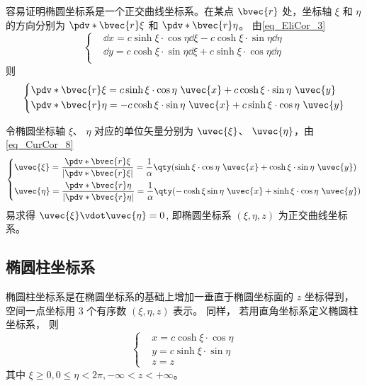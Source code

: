 容易证明椭圆坐标系是一个正交曲线坐标系。在某点 $\bvec{r}$ 处，坐标轴 $\xi$ 和 $\eta$ 的方向分别为 $\pdv*{\bvec{r}}{\xi}$ 和 $\pdv*{\bvec{r}}{\eta}$。
由\autoref{eq_EliCor_3} 
\begin{equation}
\left\{
    \begin{aligned}
    &\dd x=c\sinh\xi\cdot\cos\eta\dd\xi-c\cosh\xi\cdot\sin\eta\dd\eta\\
    &\dd y=c\cosh\xi\cdot\sin\eta\dd\xi+c\sinh\xi\cdot\cos\eta\dd\eta\\
    \end{aligned}\right.
\end{equation}
则
\begin{equation}
\left\{
    \begin{aligned}
&\pdv*{\bvec{r}}{\xi}=c\sinh\xi\cdot\cos\eta\ \uvec{x}+c\cosh\xi\cdot\sin\eta\ \uvec{y}\\
&\pdv*{\bvec{r}}{\eta}=-c\cosh\xi\cdot\sin\eta\ \uvec{x}+c\sinh\xi\cdot\cos\eta\ \uvec{y}\\
    \end{aligned}\right.
\end{equation}

令椭圆坐标轴 $\xi$、 $\eta$ 对应的单位矢量分别为 $\uvec{\xi}$、 $\uvec{\eta}$，由\autoref{eq_CurCor_8}~
\begin{equation}
\left\{
    \begin{aligned}
    &\uvec{\xi}=\frac{\pdv*{\bvec{r}}{\xi}}{|\pdv*{\bvec{r}}{\xi}|}=\frac{1}{\alpha}\qty(\sinh\xi\cdot\cos\eta\ \uvec{x}+\cosh\xi\cdot\sin\eta\ \uvec{y})\\
    &\uvec{\eta }=\frac{\pdv*{\bvec{r}}{\eta}}{|\pdv*{\bvec{r}}{\eta}|}=\frac{1}{\alpha}\qty(-\cosh\xi\sin\eta\ \uvec{x}+\sinh\xi\cdot\cos\eta\ \uvec{y})\\
    \end{aligned}\right.
\end{equation}
易求得 $\uvec{\xi}\vdot\uvec{\eta} = 0$,  即椭圆坐标系 $(\xi,\eta,z)$ 为正交曲线坐标系。

\subsection{椭圆柱坐标系}
椭圆柱坐标系是在椭圆坐标系的基础上增加一垂直于椭圆坐标面的 $z$ 坐标得到， 空间一点坐标用 3 个有序数 $(\xi,\eta,z)$ 表示。 同样， 若用直角坐标系定义椭圆柱坐标系， 则
\begin{equation}\label{eq_EliCor_1}
\left\{\begin{aligned}
&x=c\cosh\xi\cdot\cos\eta\\
&y=c\sinh\xi\cdot\sin\eta\\
&z=z
\end{aligned}\right.
\end{equation}
其中 $\xi\geq0,0\leq\eta<2\pi,-\infty<z<+\infty$。

